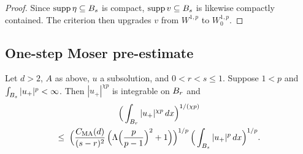 \begin{proof}
\leanok
{}

Since $\operatorname{supp} \eta \subseteq B_{s}$ is compact, $\operatorname{supp} v \subseteq B_{s}$ is
likewise compactly contained. The criterion
 then upgrades $v$ from
$W^{1,p}$ to $W^{1,p}_0$.
\end{proof}

\subsection{One-step Moser pre-estimate}

\begin{theorem}
\label{thm:moser-preMoser}
\leanok
{}
Let $d > 2$, $A$ as above, $u$ a subsolution, and $0 < r < s \leq 1$.
Suppose $1 < p$ and $\int_{B_{s}} |u_+|^p < \infty$. Then $|u_+|^{\chi p}$
is integrable on $B_{r}$ and
\begin{multline*}
  \Big(\int_{B_{r}} |u_+|^{\chi p}\,dx\Big)^{1/(\chi p)}
  \\ \leq\;
  \Big(\frac{C_{\mathrm{MA}}(d)}{(s-r)^{2}}\,
    \Big(\Lambda\Big(\frac{p}{p-1}\Big)^{2} + 1\Big)\Big)^{1/p}
  \,\Big(\int_{B_{s}} |u_+|^{p}\,dx\Big)^{1/p}.
\end{multline*}
\end{theorem}

